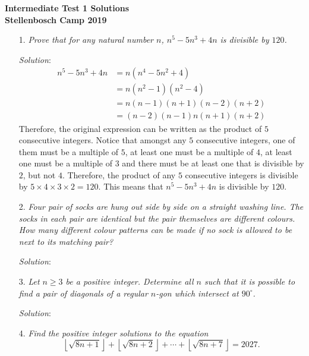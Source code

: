 \documentclass{article}
\begin{document}
\begin{center}
  \textbf{\Large Intermediate Test 1 Solutions}
  \\ \vspace{1em}
  \textbf{\large Stellenbosch Camp 2019}
\end{center}

\vspace{12pt}

\begin{enumerate}[1.]

\item[1.] %
\textit{Prove that for any natural number $n$, $n^5-5n^3+4n$ is divisible by $120$. }

\textit{Solution}:
\begin{align*}
  n^5 - 5n^3 + 4n &= n(n^4 - 5n^2 + 4) \\
  &= n(n^2 - 1)(n^2 - 4) \\
  &= n(n - 1)(n + 1)(n - 2)(n + 2) \\
  &= (n - 2)(n - 1)n(n + 1)(n + 2)
\end{align*}
Therefore, the original expression can be written as the product of $5$ consecutive integers. Notice that amongst any $5$ consecutive integers, one of them must be a multiple of $5$, at least one must be a multiple of $4$, at least one must be a multiple of $3$ and there must be at least one that is divisible by $2$, but not $4$.
Therefore, the product of any $5$ consecutive integers is divisible by $5 \times 4 \times 3 \times 2 = 120$. This means that $n^5 - 5n^3 + 4n$ is divisible by $120$.

\item[2.] %
\textit{Four pair of socks are hung out side by side on a straight washing line.
The socks in each pair are identical but the pair themselves are different colours.
How many different colour patterns can be made if no sock is allowed to be next to its matching pair?
}

\textit{Solution}:


\item[3.] %
\textit{Let $n\geq3$ be a positive integer.
Determine all $n$ such that it is possible to find a pair of diagonals of a regular $n$-gon which intersect at $90^\circ$.}

\textit{Solution}:


\item[4.] %
\newcommand{\floorsqrt}[1]{\left\lfloor\sqrt{#1}\right\rfloor} 
\textit{
Find the positive integer solutions to the equation
\[ \floorsqrt{8n+1} +\floorsqrt{8n+2} +\dotsb +\floorsqrt{8n+7} = 2027. \]}


\end{enumerate}
\end{document}

